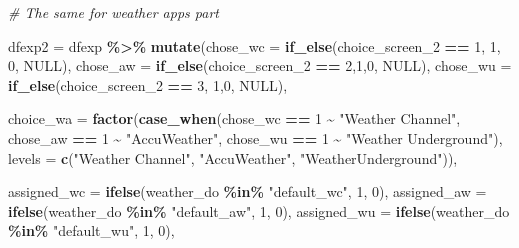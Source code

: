 \documentclass[
  11pt,
]{article}
\newenvironment{Shaded}{\begin{snugshade}}{\end{snugshade}}
\newcommand{\AttributeTok}[1]{\textcolor[rgb]{0.13,0.29,0.53}{#1}}
\newcommand{\CommentTok}[1]{\textcolor[rgb]{0.56,0.35,0.01}{\textit{#1}}}
\newcommand{\ConstantTok}[1]{\textcolor[rgb]{0.56,0.35,0.01}{#1}}
\newcommand{\DecValTok}[1]{\textcolor[rgb]{0.00,0.00,0.81}{#1}}
\newcommand{\FunctionTok}[1]{\textcolor[rgb]{0.13,0.29,0.53}{\textbf{#1}}}
\newcommand{\NormalTok}[1]{#1}
\newcommand{\OtherTok}[1]{\textcolor[rgb]{0.56,0.35,0.01}{#1}}
\newcommand{\SpecialCharTok}[1]{\textcolor[rgb]{0.81,0.36,0.00}{\textbf{#1}}}
\newcommand{\StringTok}[1]{\textcolor[rgb]{0.31,0.60,0.02}{#1}}
\begin{document}
\begin{Shaded}
\begin{Highlighting}[]
\CommentTok{\# The same for weather apps part}

\NormalTok{dfexp2 }\OtherTok{=}\NormalTok{ dfexp }\SpecialCharTok{\%\textgreater{}\%} 
  \FunctionTok{mutate}\NormalTok{(}\AttributeTok{chose\_wc =} \FunctionTok{if\_else}\NormalTok{(choice\_screen\_2 }\SpecialCharTok{==} \DecValTok{1}\NormalTok{, }\DecValTok{1}\NormalTok{, }\DecValTok{0}\NormalTok{, }\ConstantTok{NULL}\NormalTok{),}
         \AttributeTok{chose\_aw =} \FunctionTok{if\_else}\NormalTok{(choice\_screen\_2 }\SpecialCharTok{==} \DecValTok{2}\NormalTok{,}\DecValTok{1}\NormalTok{,}\DecValTok{0}\NormalTok{, }\ConstantTok{NULL}\NormalTok{),}
         \AttributeTok{chose\_wu =} \FunctionTok{if\_else}\NormalTok{(choice\_screen\_2 }\SpecialCharTok{==} \DecValTok{3}\NormalTok{, }\DecValTok{1}\NormalTok{,}\DecValTok{0}\NormalTok{, }\ConstantTok{NULL}\NormalTok{),}
         
         \AttributeTok{choice\_wa =} \FunctionTok{factor}\NormalTok{(}\FunctionTok{case\_when}\NormalTok{(chose\_wc }\SpecialCharTok{==} \DecValTok{1} \SpecialCharTok{\textasciitilde{}} \StringTok{"Weather Channel"}\NormalTok{,}
\NormalTok{                            chose\_aw }\SpecialCharTok{==} \DecValTok{1} \SpecialCharTok{\textasciitilde{}} \StringTok{"AccuWeather"}\NormalTok{,}
\NormalTok{                            chose\_wu }\SpecialCharTok{==} \DecValTok{1} \SpecialCharTok{\textasciitilde{}} \StringTok{"Weather Underground"}\NormalTok{),}
                         \AttributeTok{levels =} \FunctionTok{c}\NormalTok{(}\StringTok{"Weather Channel"}\NormalTok{, }
                                    \StringTok{"AccuWeather"}\NormalTok{, }
                                    \StringTok{"WeatherUnderground"}\NormalTok{)),}
         
         \AttributeTok{assigned\_wc =} \FunctionTok{ifelse}\NormalTok{(weather\_do }\SpecialCharTok{\%in\%} \StringTok{"default\_wc"}\NormalTok{, }\DecValTok{1}\NormalTok{, }\DecValTok{0}\NormalTok{), }
         \AttributeTok{assigned\_aw =} \FunctionTok{ifelse}\NormalTok{(weather\_do }\SpecialCharTok{\%in\%} \StringTok{"default\_aw"}\NormalTok{, }\DecValTok{1}\NormalTok{, }\DecValTok{0}\NormalTok{),}
         \AttributeTok{assigned\_wu =} \FunctionTok{ifelse}\NormalTok{(weather\_do }\SpecialCharTok{\%in\%} \StringTok{"default\_wu"}\NormalTok{, }\DecValTok{1}\NormalTok{, }\DecValTok{0}\NormalTok{),}
         

\end{Highlighting}
\end{Shaded}
\end{document}
